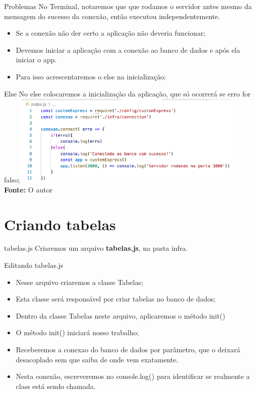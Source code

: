 \documentclass{beamer}
\begin{document}
    \begin{frame}[label=lists]{Problemas}
    No Terminal, notaremos que que rodamos o servidor antes mesmo da mensagem do sucesso da conexão, então executou independentemente.
   \begin{itemize}
       \item Se a conexão não der certo a aplicação não deveria funcionar;
       \item Devemos iniciar a aplicação com a conexão ao banco de dados e após ela iniciar o app.
       \item Para isso acrescentaremos o \alert{else} na inicialização;
    \end{itemize}
    \end{frame}
    \begin{frame}[label=lists]{Else}
    No \alert{else} colocaremos a inicialização da aplicação, que só ocorrerá se \alert{erro} for falso;
	\includegraphics[width=110mm]{resources/aula6_4.png}\\
            \tiny{\textbf{Fonte:} O autor}

    \end{frame}
   
 \section{Criando tabelas}
    \begin{frame}[label=lists]{tabelas.js}
    Criaremos um arquivo \textbf{tabelas.js}, na pasta infra.
	\begin{exampleblock}{Editando tabelas.js}
		\begin{itemize}
			\item Nesse arquivo criaremos a classe \alert{Tabelas};
			\item Esta classe será responsável por criar tabelas no banco de dados;
			\item Dentro da classe \alert{Tabelas} neste arquivo, aplicaremos o método \alert{init()} 
			\item O método init() iniciará nosso trabalho;
			\item Receberemos a \alert{conexao} do banco de dados por parâmetro, que o deixará desacoplado sem que saiba de onde vem exatamente.
			\item Nesta conexão, escreveremos no \alert{console.log()} para identificar se realmente a class está sendo chamada.
		\end{itemize}
	\end{exampleblock}
	     \end{frame}
   
\end{document}
